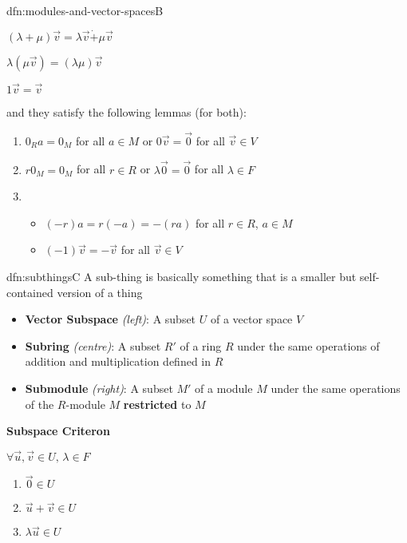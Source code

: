 \documentclass[landscape, 8pt]{extarticle}
\begin{document}
\begin{multicols}{3}
\begin{dfn}{dfn:modules-and-vector-spaces}{B}
\begin{multicols}{3}
            $(\lambda + \mu)\vec{v} = \lambda \vec{v} \dot{+} \mu \vec{v}$

            $\lambda (\mu \vec{v}) = (\lambda \mu) \vec{v}$

            $1\vec{v} = \vec{v}$
    \end{multicols}


    and they satisfy the following lemmas (for both):
    \begin{enumerate}
        \setlength\itemsep{0em}
        \item $0_{R} a = 0_{M}$ for all $a\in M$ \quad or \quad $0 \vec{v} = \vec{0}$ for all $\vec{v} \in V$
        \item $r 0_{M} = 0_{M}$ for all $r\in R$ \quad or \quad $\lambda \vec{0} = \vec{0}$ for all $\lambda\in F$
        \item \begin{itemize}[leftmargin=*]
            \setlength\itemsep{0em}
            \item $(-r)a = r(-a) = -(ra)$ for all $r\in R$, $a\in M$
            \item $(-1)\vec{v} = -\vec{v}$ for all $\vec{v}\in V$
        \end{itemize}
    \end{enumerate}
\end{dfn}




\begin{dfn}{dfn:subthings}{C}
    A sub-thing is basically something that is a smaller but self-contained version of a thing

    \begin{itemize}
        \setlength\itemsep{0em}
        \item \textbf{Vector Subspace} \textit{(left)}: A subset $U$ of a vector space $V$
        \item \textbf{Subring} \textit{(centre)}: A subset $R'$ of a ring $R$ under the same operations of addition and multiplication defined in $R$
        \item \textbf{Submodule} \textit{(right)}: A subset $M'$ of a module $M$ under the same operations of the $R$-module $M$ \textbf{restricted} to $M$
    \end{itemize}

    \setlength{\columnseprule}{0.5pt}
    \begin{multicols}{3}
        \textbf{Subspace Criteron}

        $\forall\vec{u}, \vec{v}\in U,\,\lambda\in F$
        \begin{enumerate}[leftmargin=*]
            \item $\vec{0}\in U$
            \item $\vec{u} + \vec{v} \in U$
            \item $\lambda \vec{u}\in U$
        \end{enumerate}
        \columnbreak    


\end{multicols}
\end{dfn}
\end{multicols}
\end{document}
